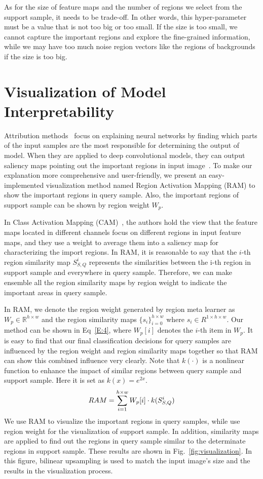 \documentclass[letterpaper]{article}
\begin{document}
As for the size of feature maps and the number of regions we select from the support sample, it needs to be trade-off. In other words, this hyper-parameter must be a value that is not too big or too small. If the size is too small, we cannot capture the important regions and explore the fine-grained information, while we may have too much noise region vectors like the regions of backgrounds if the size is too big.  

\section{Visualization of Model Interpretability}\label{section: Vis}
Attribution methods~\cite{petsiuk2018rise,zhou2016learning} focus on explaining neural networks by finding which parts of the input samples are the most responsible for determining the output of model. When they are applied to deep convolutional models, they can output saliency maps pointing out the important regions in input image~\cite{fong2019pertubation}. 
To make our explanation more comprehensive and user-friendly, we present an easy-implemented visualization method named Region Activation Mapping (RAM) to show the important regions in query sample. Also, the important regions of support sample can be shown by region weight $W_{p}$.

In Class Activation Mapping (CAM)~\cite{zhou2016learning}, the authors hold the view that the feature maps located in different channels focus on different regions in input feature maps, and they use a weight to average them into a saliency map for characterizing the import regions. In RAM, it is reasonable to say that the $i$-th region similarity map $S^{i}_{S,Q}$ represents the similarities between the i-th region in support sample and everywhere in query sample. Therefore, we can make ensemble all the region similarity maps by region weight to indicate the important areas in query sample.


In RAM, we denote the region weight generated by region meta learner as $W_{p}\in \mathbb{R}^{h\times w}$ and the region similarity maps $\{s_{i}\}_{i=0}^{h\times w}$ where $s_{i}\in R^{1\times h\times w}$. Our method can be shown in Eq~\ref{E:4}, where $W_{p}[i]$ denotes the $i$-th item in $W_{p}$. It is easy to find that our final classification decisions for query samples are influenced by the region weight and region similarity maps together so that RAM can show this combined influence very clearly. Note that $k(\cdot)$ is a nonlinear function to enhance the impact of similar regions between query sample and support sample. Here it is set as $k(x) = e^{2x}$.      
\begin{equation}\scriptsize
    RAM = \sum_{i=1}^{h\times w}W_{p}[i]\cdot k(S_{S,Q}^{i})\label{E:4}
\end{equation}
We use RAM to visualize the important regions in query samples, while use region weight for the visualization of support sample. In addition, similarity maps are applied to find out the regions in query sample similar to the determinate regions in support sample. These results are shown in Fig.~\ref{fig:visualization}. In this figure, bilinear upsampling is used to match the input image's size and the results in the visualization process. 
\end{document}
